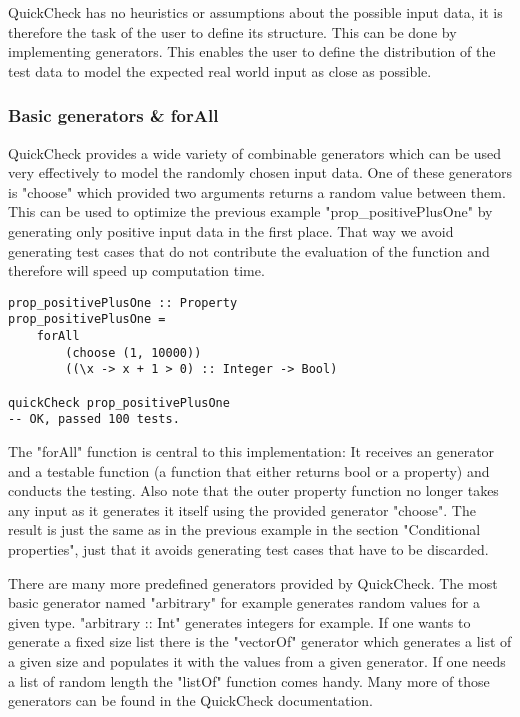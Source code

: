 \documentclass[a4paper, 12pt]{article} %
\begin{document}
QuickCheck has no heuristics or assumptions about the possible input data, it is therefore the task of the user to define its structure. This can be done by implementing generators. This enables the user to define the distribution of the test data to model the expected real world input as close as possible.


\subsubsection{Basic generators \& forAll}

QuickCheck provides a wide variety of combinable generators which can be used very effectively to model the randomly chosen input data. One of these generators is "choose" which provided two arguments returns a random value between them. This can be used to optimize the previous example "prop\_positivePlusOne" by generating only positive input data in the first place. That way we avoid generating test cases that do not contribute the evaluation of the function and therefore will speed up computation time. 

\begin{verbatim}
prop_positivePlusOne :: Property
prop_positivePlusOne = 
    forAll
        (choose (1, 10000))
        ((\x -> x + 1 > 0) :: Integer -> Bool)

quickCheck prop_positivePlusOne
-- OK, passed 100 tests.
\end{verbatim}

The "forAll" function is central to this implementation: It receives an generator and a testable function (a function that either returns bool or a property) and conducts the testing. Also note that the outer property function no longer takes any input as it generates it itself using the provided generator "choose". The result is just the same as in the previous example in the section "Conditional properties", just that it avoids generating test cases that have to be discarded.

There are many more predefined generators provided by QuickCheck. The most basic generator named "arbitrary" for example generates random values for a given type. "arbitrary :: Int" generates integers for example. If one wants to generate a fixed size list there is the "vectorOf" generator which generates a list of a given size and populates it with the values from a given generator. If one needs a list of random length the "listOf" function comes handy. Many more of those generators can be found in the QuickCheck documentation. \cite{documentation}
\end{document}
